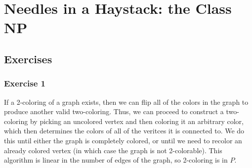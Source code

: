\section{Needles in a Haystack: the Class NP}

\subsection{Exercises}

\subsubsection{Exercise 1}
If a 2-coloring of a graph exists, then we can flip all of the colors in the graph to produce another valid
two-coloring. Thus, we can proceed to construct a two-coloring by picking an uncolored vertex and then coloring
it an arbitrary color, which then determines the colors of all of the veritces it is connected to. We do
this until either the graph is completely colored, or until we need to recolor an already colored vertex
(in which case the graph is not 2-colorable). This algorithm is linear in the number of edges of the graph, so 2-coloring is in $P$.


